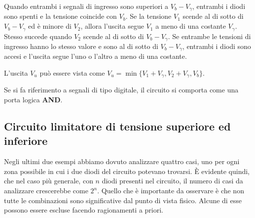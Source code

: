 \documentclass[../elettronica]{subfiles}
\begin{document}
Quando entrambi i segnali di ingresso sono superiori a $V_b - V_\gamma$, entrambi i diodi sono spenti e la tensione coincide con $V_b$.
Se la tensione $V_1$ scende al di sotto di $V_b - V_\gamma$ ed è minore di $V_2$, allora l'uscita segue $V_1$ a meno di una
costante $V_\gamma$.
Stesso succede quando $V_2$ scende al di sotto di $V_b - V_\gamma$.
Se entrambe le tensioni di ingresso hanno lo stesso valore e sono al di sotto di $V_b - V_\gamma$, entrambi i diodi sono accesi
e l'uscita segue l'uno o l'altro a meno di una costante.

L'uscita $V_u$ può essere vista come $V_u = \min\big\{V_1 + V_\gamma, V_2 + V_\gamma, V_b\big\}$.

\begin{figure}[h]
    \centering
    \begin{minipage}[b]{.45\textwidth}
    \end{minipage}
    \begin{minipage}[b]{.45\textwidth}
    \end{minipage}
\end{figure}

Se si fa riferimento a segnali di tipo digitale, il circuito si comporta come una porta logica \textbf{AND}.

\subsection{Circuito limitatore di tensione superiore ed inferiore}
Negli ultimi due esempi abbiamo dovuto analizzare quattro casi, uno per ogni zona possibile in cui
i due diodi del circuito potevano trovarsi. È evidente quindi, che nel caso più generale, con $n$ diodi
presenti nel circuito, il numero di casi da analizzare crescerebbe come $2^n$.
Quello che è importante da osservare è che non tutte le combinazioni sono significative dal punto di vista
fisico.
Alcune di esse possono essere escluse facendo ragionamenti a priori.
\end{document}
